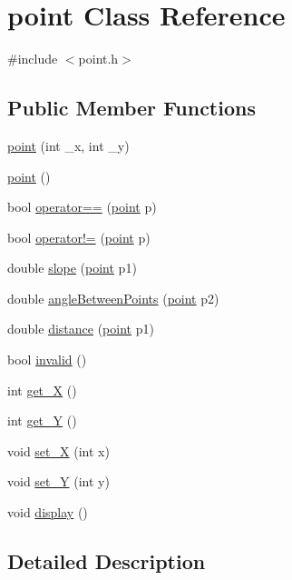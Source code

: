 \hypertarget{classpoint}{
\section{point Class Reference}
\label{classpoint}
}


{\ttfamily \#include $<$point.h$>$}

\subsection*{Public Member Functions}
\begin{DoxyCompactItemize}
\item 
\hyperlink{classpoint_aa88449134280c0bc569f86fa98785ec0}{point} (int \_\-x, int \_\-y)
\item 
\hyperlink{classpoint_a5fe21d4a4539320bf0f5caf1218d31c8}{point} ()
\item 
bool \hyperlink{classpoint_a1b726e5c7b1c25647d685fe48d9a6e39}{operator==} (\hyperlink{classpoint}{point} p)
\item 
bool \hyperlink{classpoint_a37e9a3ccade55cb6a424888737098571}{operator!=} (\hyperlink{classpoint}{point} p)
\item 
double \hyperlink{classpoint_a28c43f3dbee6708f604346ec918c0286}{slope} (\hyperlink{classpoint}{point} p1)
\item 
double \hyperlink{classpoint_aac62db6bc3e2f7d35950ffa8789fde18}{angleBetweenPoints} (\hyperlink{classpoint}{point} p2)
\item 
double \hyperlink{classpoint_aa1af528ca96a10e9d3a3e6b1af7112ee}{distance} (\hyperlink{classpoint}{point} p1)
\item 
bool \hyperlink{classpoint_a58da89079c34bdc898a0ef8117648ae5}{invalid} ()
\item 
int \hyperlink{classpoint_a3d31b560b17fcf65bea36469e49a6fb4}{get\_\-X} ()
\item 
int \hyperlink{classpoint_aa8d43ec6f46ac2ab3251bf188df582d9}{get\_\-Y} ()
\item 
void \hyperlink{classpoint_a584a6daa9ea5e8204be3b1a610cee9e1}{set\_\-X} (int x)
\item 
void \hyperlink{classpoint_ad17be1d73dfe1af57d7f2ce25bb05732}{set\_\-Y} (int y)
\item 
void \hyperlink{classpoint_a0b248ae2a8dab47a95f68ffb03f33ede}{display} ()
\end{DoxyCompactItemize}


\subsection{Detailed Description}


